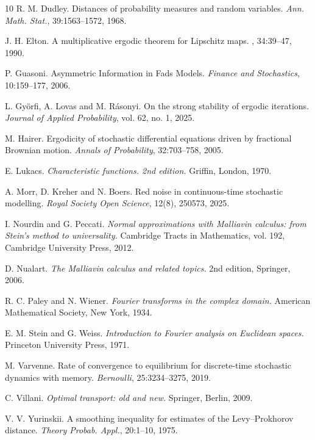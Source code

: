 \documentclass{article}
\begin{document}
\begin{thebibliography}{10}
 R. M. Dudley. \newblock Distances of probability measures and random variables.
\newblock \emph{Ann. Math. Stat.}, 39:1563--1572, 1968.

J. H. Elton. \newblock A multiplicative ergodic theorem for Lipschitz maps.
, 34:39--47, 1990.

 P. Guasoni.
\newblock Asymmetric Information in Fads Models.
\newblock \emph{Finance and Stochastics}, 10:159--177, 2006.

 L. Gy\"orfi, A. Lovas and M. R\'asonyi.{}
\newblock On the strong stability of ergodic iterations.
\newblock \emph{Journal of Applied Probability}, vol. 62, no. 1, 2025.

 M. Hairer. 
\newblock Ergodicity of stochastic differential equations driven by fractional Brownian motion.
\newblock \emph{Annals of
Probability}, 32:703--758, 2005.

 E. Lukacs.
\newblock \emph{Characteristic functions. 2nd edition.}
\newblock Griffin, London, 1970. 

 A. Morr, D. Kreher and N. Boers. 
\newblock Red noise in continuous-time stochastic modelling.
\newblock \emph{Royal Society Open Science}, 12(8), 250573, 2025.

 I. Nourdin and G. Peccati.
\newblock \emph{Normal approximations with Malliavin calculus: from Stein's method to
universality.}
\newblock Cambridge Tracts in Mathematics, vol. 192,
\newblock Cambridge University Press, 2012.

 D. Nualart.
\newblock \emph{The Malliavin calculus and related topics.} 
\newblock 2nd edition, Springer, 2006.

 R. C. Paley and N. Wiener.
\newblock \emph{Fourier transforms in the complex domain.}
\newblock American Mathematical Society, New York, 1934.

 E. M. Stein and G. Weiss.
\newblock \emph{Introduction to Fourier analysis on Euclidean spaces.}
\newblock Princeton University Press, 1971.

 M. Varvenne.
\newblock Rate of convergence to equilibrium for discrete-time
stochastic dynamics with memory.
\newblock \emph{Bernoulli}, 25:3234--3275, 2019.

C. Villani.
\newblock \emph{Optimal transport: old and new.}
\newblock Springer, Berlin, 2009.


V. V. Yurinskii.
\newblock A smoothing inequality for estimates of the Levy--Prokhorov distance. 
\newblock \emph{Theory Probab. Appl.}, 20:1--10, 1975.






\end{thebibliography}
\end{document}
